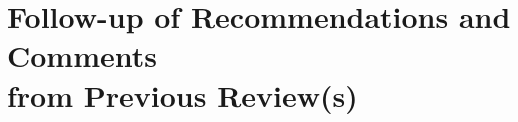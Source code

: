 
\clearpage
\section[Follow-up of Recommendations and Comments from Previous Review(s)]{\texorpdfstring{Follow-up of Recommendations and Comments\\from Previous Review(s)}{Follow-up of Recommendations and Comments from Previous Review(s)}}
\label{sec:follow-up-reviews}



